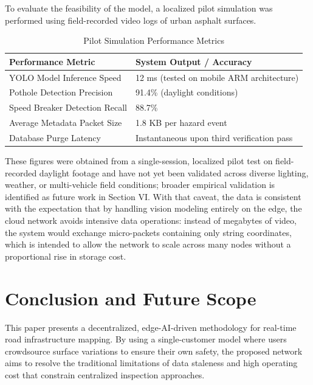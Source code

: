 \documentclass[conference]{IEEEtran}
\begin{document}
To evaluate the feasibility of the model, a localized pilot simulation was performed using field-recorded video logs of urban asphalt surfaces.

\begin{table}[htbp]
\caption{Pilot Simulation Performance Metrics}
\begin{center}
\begin{tabular}{|p{3.7cm}|p{3.6cm}|}
\hline
\textbf{Performance Metric} & \textbf{System Output / Accuracy} \\
\hline
YOLO Model Inference Speed & 12 ms (tested on mobile ARM architecture) \\
\hline
Pothole Detection Precision & 91.4\% (daylight conditions) \\
\hline
Speed Breaker Detection Recall & 88.7\% \\
\hline
Average Metadata Packet Size & 1.8 KB per hazard event \\
\hline
Database Purge Latency & Instantaneous upon third verification pass \\
\hline
\end{tabular}
\label{tab:results}
\end{center}
\end{table}

These figures were obtained from a single-session, localized pilot test on field-recorded daylight footage and have not yet been validated across diverse lighting, weather, or multi-vehicle field conditions; broader empirical validation is identified as future work in Section VI. With that caveat, the data is consistent with the expectation that by handling vision modeling entirely on the edge, the cloud network avoids intensive data operations: instead of megabytes of video, the system would exchange micro-packets containing only string coordinates, which is intended to allow the network to scale across many nodes without a proportional rise in storage cost.

\section{Conclusion and Future Scope}

This paper presents a decentralized, edge-AI-driven methodology for real-time road infrastructure mapping. By using a single-customer model where users crowdsource surface variations to ensure their own safety, the proposed network aims to resolve the traditional limitations of data staleness and high operating cost that constrain centralized inspection approaches.
\end{document}
